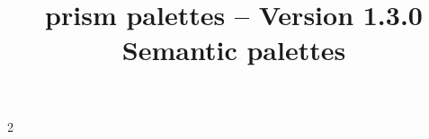 \documentclass[theme = dark]{tutodoc}
\title{\raisebox{-.20ex}{@}prism palettes -- Version 1.3.0\\ Semantic palettes}
\date{}
\begin{document}
\maketitle{}

{
  \setlength{\columnsep}{2cm}
  \setlength{\columnseprule}{0.4pt}

  \begin{multicols}{2}
    \tableofcontents
  \end{multicols}
}

\newpage


















\end{document}
